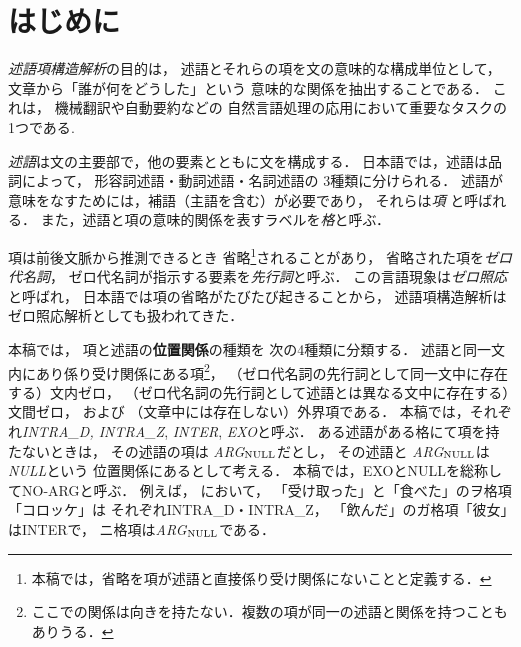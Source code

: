 \documentclass[japanese]{jnlp_1.4}
\newcommand{\exref}[1]{}
\newcommand{\enumsentence}[2]{}
\begin{document}
\maketitle


\section{はじめに}
\label{intro}



\emph{述語項構造解析}の目的は，
述語とそれらの項を文の意味的な構成単位として，
文章から「誰が何をどうした」という
意味的な関係を抽出することである．
これは，
機械翻訳や自動要約などの
自然言語処理の応用において重要なタスクの1つである\cite{Surdeanu:2003:ACL,Wu:EAMT:2009}.



\emph{述語}は文の主要部で，他の要素とともに文を構成する\cite{ModernJapaneseGrammar1}．
日本語では，述語は品詞によって，
形容詞述語・動詞述語・名詞述語の
3種類に分けられる．
述語が意味をなすためには，補語（主語を含む）が必要であり，
それらは\emph{項}
と呼ばれる．
また，述語と項の意味的関係を表すラベルを\emph{格}と呼ぶ．

項は前後文脈から推測できるとき
省略\footnote{本稿では，省略を項が述語と直接係り受け関係にないことと定義する．}されることがあり，
省略された項を\emph{ゼロ代名詞}，
ゼロ代名詞が指示する要素を\emph{先行詞}と呼ぶ．
この言語現象は\emph{ゼロ照応}と呼ばれ，
日本語では項の省略がたびたび起きることから，
述語項構造解析は
ゼロ照応解析としても扱われてきた\cite{Kawahara:2004:JNLP,Sasano:IPSJ:2011}．

本稿では，
項と述語の\textbf{位置関係}の種類を
次の4種類に分類する．
述語と同一文内にあり係り受け関係にある項\footnote{ここでの関係は向きを持たない．複数の項が同一の述語と関係を持つこともありうる．}，
（ゼロ代名詞の先行詞として同一文中に存在する）文内ゼロ，
（ゼロ代名詞の先行詞として述語とは異なる文中に存在する）文間ゼロ，
および
（文章中には存在しない）外界項である．
本稿では，それぞれ\emph{INTRA\_D, INTRA\_Z}, \emph{INTER}, \emph{EXO}と呼ぶ．
ある述語がある格にて項を持たないときは，
その述語の項は
\emph{\rm{ARG}$_{\rm{NULL}}$}だとし，
その述語と
\emph{\rm{ARG}$_{\rm{NULL}}$}は
\emph{NULL}という
位置関係にあるとして考える．
本稿では，EXOとNULLを総称してNO-ARGと呼ぶ．
例えば，
\exref{exs-atype}において，
「受け取った」と「食べた」のヲ格項「コロッケ」は
それぞれINTRA\_D・INTRA\_Z，
「飲んだ」のガ格項「彼女」はINTERで，
ニ格項は\emph{\rm{ARG}$_{\rm{NULL}}$}である．
\enumsentence{
コロッケを受け取った彼女は，急いで食べた．\\
（$\phi$が）ジュースも飲んだ．
}{exs-atype}
\end{document}
